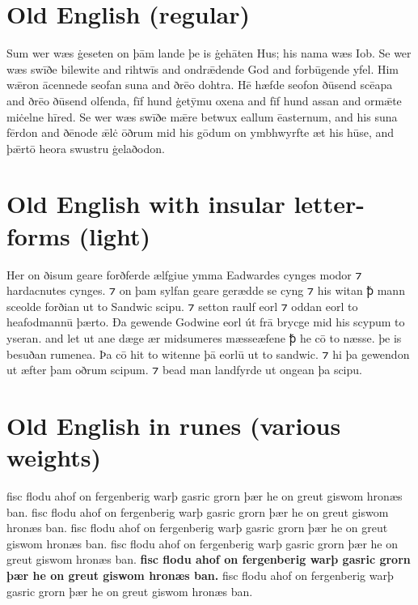 \documentclass[12pt,letterpaper,openany]{book}
\begin{document}
\section{Old English (regular)}

{\large Sum wer wæs ġeseten on þām lande þe is ġehāten Hus; his nama wæs Iob. Se wer wæs swīðe bilewite and rihtwīs and ondrǣdende God and forbūgende yfel. Him wǣron ācennede seofan suna and ðrēo dohtra. Hē hæfde seofon ðūsend scēapa and ðrēo ðūsend olfenda, fīf hund ġetȳmu oxena and fīf hund assan and ormǣte miċelne hīred. Se wer wæs swīðe mǣre betwux eallum ēasternum, and his suna fērdon and ðēnode ǣlċ ōðrum mid his gōdum on ymbhwyrfte æt his hūse, and þǣrtō heora swustru ġelaðodon.}

\section{Old English with insular letter-forms (light)}

{\large\light{}Her on ðisum geare forðferde ælfgiue ymma Eadwardes cynges modor ⁊ hardacnutes cynges. ⁊ on þam sylfan geare gerædde se cyng ⁊ his witan ꝥ mann sceolde forðian ut to Sandwic scipu. ⁊ setton raulf eorl ⁊ oddan eorl to heafodmannū þærto. Ða gewende Godwine eorl út frā brycge mid his scypum to yseran. and let ut ane dæge ær midsumeres mæsseæfene ꝥ he cō to næsse. þe is besuðan rumenea. Þa cō hit to witenne þā eorlū ut to sandwic. ⁊ hi þa gewendon ut æfter þam oðrum scipum. ⁊ bead man landfyrde ut ongean þa scipu.}

\section{Old English in runes (various weights)}

{\extralight{} fisc flodu ahof on fergenberig warþ gasric grorn þær he on greut giswom hronæs ban.
\light{} fisc flodu ahof on fergenberig warþ gasric grorn þær he on greut giswom hronæs ban.
\medium{} fisc flodu ahof on fergenberig warþ gasric grorn þær he on greut giswom hronæs ban.
\semibold{} fisc flodu ahof on fergenberig warþ gasric grorn þær he on greut giswom hronæs ban.
\textbf{fisc flodu ahof on fergenberig warþ gasric grorn þær he on greut giswom hronæs ban.}
\extrabold{} fisc flodu ahof on fergenberig warþ gasric grorn þær he on greut giswom hronæs ban.}
\end{document}
